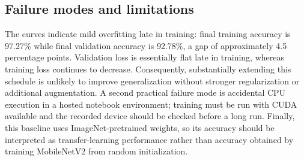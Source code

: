 \documentclass[12pt,a4paper]{article}
\begin{document}
\subsection{Failure modes and limitations}

The curves indicate mild overfitting late in training: final training accuracy
is 97.27\% while final validation accuracy is 92.78\%, a gap of approximately
4.5 percentage points. Validation loss is essentially flat late in training,
whereas training loss continues to decrease. Consequently,
substantially extending this schedule is unlikely to improve generalization
without stronger regularization or additional augmentation. A second practical
failure mode is accidental CPU execution in a hosted notebook environment;
training must be run with CUDA available and the recorded device should be
checked before a long run. Finally, this baseline uses ImageNet-pretrained
weights, so its accuracy should be interpreted as transfer-learning performance
rather than accuracy obtained by training MobileNetV2 from random
initialization.
\end{document}
